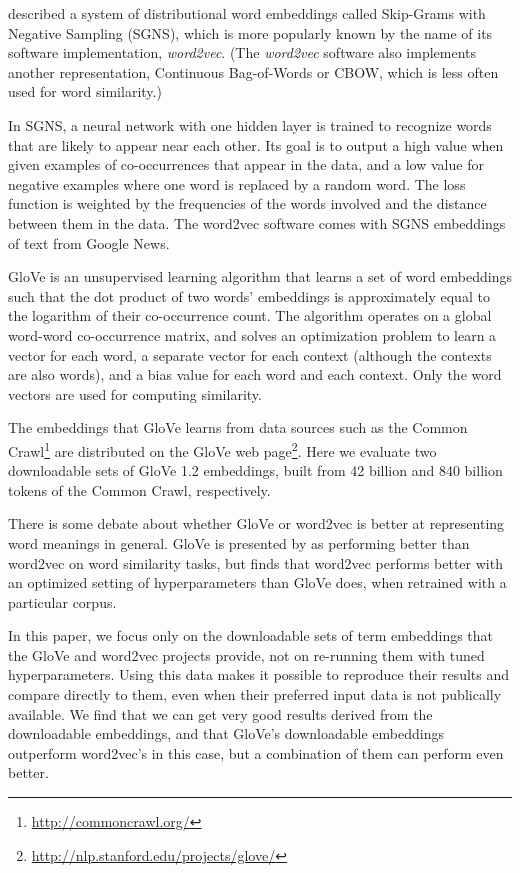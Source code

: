 \documentclass[11pt,letterpaper]{article}
\begin{document}
 described a system of distributional word
embeddings called Skip-Grams with Negative Sampling (SGNS), which is more
popularly known by the name of its software implementation, {\em word2vec}.
(The {\em word2vec} software also implements another representation, Continuous
Bag-of-Words or CBOW, which is less often used for word similarity.)

In SGNS, a neural network with one hidden layer is trained to recognize words
that are likely to appear near each other. Its goal is to output a high value
when given examples of co-occurrences that appear in the data, and a low value
for negative examples where one word is replaced by a random word. The loss
function is weighted by the frequencies of the words involved and the distance
between them in the data. The word2vec software comes with SGNS embeddings
of text from Google News.

GloVe \cite{pennington2014glove} is an unsupervised learning algorithm that
learns a set of word embeddings such that the dot product of two words'
embeddings is approximately equal to the logarithm of their co-occurrence count.
The algorithm operates on a global word-word co-occurrence matrix, and
solves an optimization problem to learn a vector for each word, a separate
vector for each context (although the contexts are also words), and a bias
value for each word and each context. Only the word vectors are used for
computing similarity.

The embeddings that GloVe learns from data sources such as the Common
Crawl\footnote{\url{http://commoncrawl.org/}} are distributed on the GloVe web
page\footnote{\url{http://nlp.stanford.edu/projects/glove/}}. Here we evaluate
two downloadable sets of GloVe 1.2 embeddings, built from 42 billion and 840
billion tokens of the Common Crawl, respectively.

There is some debate about whether GloVe or word2vec is better at representing
word meanings in general. GloVe is presented by 
as performing better than word2vec on word similarity tasks, but
 finds that word2vec performs better with an
optimized setting of hyperparameters than GloVe does, when retrained with a
particular corpus.

In this paper, we focus only on the downloadable sets of term embeddings that
the GloVe and word2vec projects provide, not on re-running them with tuned
hyperparameters. Using this data makes it possible to reproduce their results
and compare directly to them, even when their preferred input data is not
publically available. We find that we can get very good results derived from
the downloadable embeddings, and that GloVe's downloadable embeddings outperform
word2vec's in this case, but a combination of them can perform even better.
\end{document}
